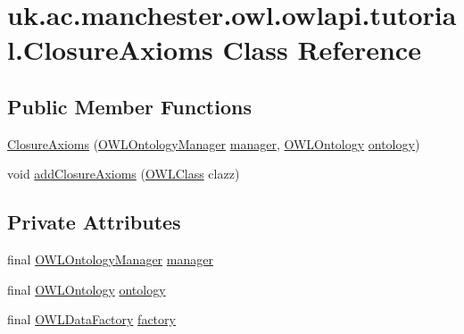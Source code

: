 \hypertarget{classuk_1_1ac_1_1manchester_1_1owl_1_1owlapi_1_1tutorial_1_1_closure_axioms}{\section{uk.\-ac.\-manchester.\-owl.\-owlapi.\-tutorial.\-Closure\-Axioms Class Reference}
\label{classuk_1_1ac_1_1manchester_1_1owl_1_1owlapi_1_1tutorial_1_1_closure_axioms}
}
\subsection*{Public Member Functions}
\begin{DoxyCompactItemize}
\item 
\hyperlink{classuk_1_1ac_1_1manchester_1_1owl_1_1owlapi_1_1tutorial_1_1_closure_axioms_a3bb223753403493bec7fb7b8084cd2fd}{Closure\-Axioms} (\hyperlink{interfaceorg_1_1semanticweb_1_1owlapi_1_1model_1_1_o_w_l_ontology_manager}{O\-W\-L\-Ontology\-Manager} \hyperlink{classuk_1_1ac_1_1manchester_1_1owl_1_1owlapi_1_1tutorial_1_1_closure_axioms_a87c0cc6bb9b9c79ba59907765ccb33c1}{manager}, \hyperlink{interfaceorg_1_1semanticweb_1_1owlapi_1_1model_1_1_o_w_l_ontology}{O\-W\-L\-Ontology} \hyperlink{classuk_1_1ac_1_1manchester_1_1owl_1_1owlapi_1_1tutorial_1_1_closure_axioms_ac4350f0dbf6be7810529bcbbcc2c4dff}{ontology})
\item 
void \hyperlink{classuk_1_1ac_1_1manchester_1_1owl_1_1owlapi_1_1tutorial_1_1_closure_axioms_a46d2de435e04c2fb35a2f2900cb4b70d}{add\-Closure\-Axioms} (\hyperlink{interfaceorg_1_1semanticweb_1_1owlapi_1_1model_1_1_o_w_l_class}{O\-W\-L\-Class} clazz)
\end{DoxyCompactItemize}
\subsection*{Private Attributes}
\begin{DoxyCompactItemize}
\item 
final \hyperlink{interfaceorg_1_1semanticweb_1_1owlapi_1_1model_1_1_o_w_l_ontology_manager}{O\-W\-L\-Ontology\-Manager} \hyperlink{classuk_1_1ac_1_1manchester_1_1owl_1_1owlapi_1_1tutorial_1_1_closure_axioms_a87c0cc6bb9b9c79ba59907765ccb33c1}{manager}
\item 
final \hyperlink{interfaceorg_1_1semanticweb_1_1owlapi_1_1model_1_1_o_w_l_ontology}{O\-W\-L\-Ontology} \hyperlink{classuk_1_1ac_1_1manchester_1_1owl_1_1owlapi_1_1tutorial_1_1_closure_axioms_ac4350f0dbf6be7810529bcbbcc2c4dff}{ontology}
\item 
final \hyperlink{interfaceorg_1_1semanticweb_1_1owlapi_1_1model_1_1_o_w_l_data_factory}{O\-W\-L\-Data\-Factory} \hyperlink{classuk_1_1ac_1_1manchester_1_1owl_1_1owlapi_1_1tutorial_1_1_closure_axioms_ad52cc8ceb1e6521c3f2acc3847441db3}{factory}
\end{DoxyCompactItemize}


